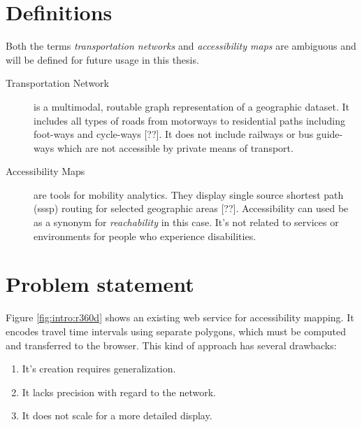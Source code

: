   \section{Definitions}
    \label{sec:intro:def}

    Both the terms \textit{transportation networks} and \textit{accessibility
    maps} are ambiguous and will be defined for future usage in this
    thesis.\par

    \begin{description}
      \item[Transportation Network] is a multimodal, routable graph
        representation of a geographic dataset.
        It includes all types of roads from motorways to residential paths
        including foot-ways and cycle-ways [??]. It does not include railways or
        bus guide-ways which are not accessible by private means of transport.
      \item[Accessibility Maps] are tools for mobility analytics. They display
        single source shortest path (\acrshort{sssp}) routing for selected
        geographic areas [??]. Accessibility can used be as a synonym for
        \textit{reachability} in this case. It's not related to services or
        environments for people who experience disabilities.


    \end{description}

  \section{Problem statement}
    \label{sec:intro:probl}

    Figure \ref{fig:intro:r360d} shows an existing web service for accessibility
    mapping. It encodes travel time intervals using separate polygons, which
    must be computed and transferred to the browser. This kind of approach has
    several drawbacks:\par

    \begin{enumerate}[\label=({D}1)]
      \item \label{enu:drawb:d1} It's creation requires generalization.
      \item \label{enu:drawb:d2} It lacks precision with regard to the network.
      \item \label{enu:drawb:d3} It does not scale for a more detailed display.
    \end{enumerate}

